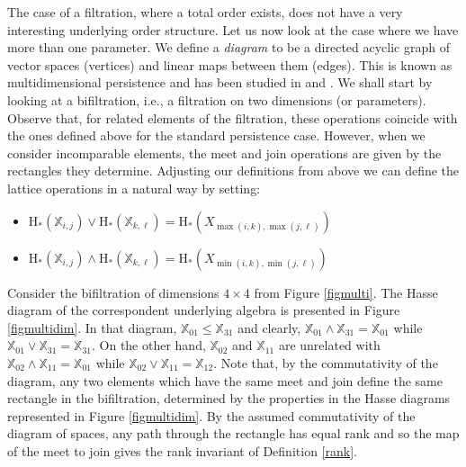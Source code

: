 \documentclass[10pt]{amsart}
\newcommand{\X}{\mathbb{X}}
\newcommand{\Hg}{\mathrm{H}}
\newcommand{\meet}{\wedge}
\newcommand{\join}{\vee}
\begin{document}
The case of a filtration, where a total order exists, does not have a very interesting underlying order structure. 
Let us now look at the case where we have more than one parameter. 
We define a \emph{diagram} to be a directed acyclic graph of vector spaces (vertices) and linear maps between them (edges). 
This is known as multidimensional persistence and has been studied in \cite{Carl09} and \cite{Zom09}. 
We shall start by looking at a bifiltration, i.e., a filtration on two dimensions (or parameters).
Observe that, for related elements of the filtration, these operations coincide with the ones defined above for the standard persistence case. 
However, when we consider incomparable elements, the meet and join operations are given by the rectangles they determine. 
Adjusting our definitions from above we can define the lattice operations in a natural way by setting:

\begin{itemize}
\item[] $\Hg_*(\X_{i,j}) \join \Hg_*(\X_{k,\ell}) = \Hg_*(X_{\max(i,k),\max(j,\ell) })$
\item[] $\Hg_*(\X_{i,j}) \meet \Hg_*(\X_{k,\ell}) = \Hg_*(X_{\min(i,k),\min(j,\ell) })$
\end{itemize}

Consider the bifiltration of dimensions $4\times 4$ from Figure \ref{figmulti}. The Hasse diagram of the correspondent underlying algebra is presented in Figure \ref{figmultidim}.
In that diagram, $\X_{01}\leq \X_{31}$ and clearly, $\X_{01}\meet \X_{31}=\X_{01}$ while $\X_{01}\join \X_{31}=\X_{31}$.
On the other hand, $\X_{02}$ and $\X_{11}$ are unrelated with $\X_{02}\meet \X_{11}=\X_{01}$ while $\X_{02}\join \X_{11}=\X_{12}$.
%
Note that, by the commutativity of the diagram, any two elements which have the same meet and join define the same rectangle in the bifiltration, determined by the properties in the Hasse diagrams represented in Figure \ref{figmultidim}. 
By the assumed commutativity of the diagram of spaces, any path through the rectangle has equal rank and so the map of the meet to join gives the rank invariant of Definition \ref{rank}. 
\end{document}

